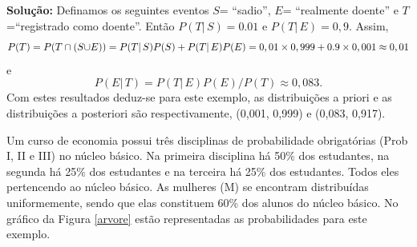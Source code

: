 \begin{frame}

{\bf Solução:} Definamos os seguintes eventos $S$= ``sadio'', $E$= ``realmente doente'' e $T$=``registrado como doente''.  Então $P(T|\,S)=0.01$ e $P(T|\,E)=0,9$. Assim,  $$P(T)=P(T\cap (S{\huge \cup} E))=P(T|\,S)P(S)+P(T|\,E)P(E)=0,01\times 0,999+0.9\times 0,001\approx 0,01$$ e $$P(E|\,T)=P(T|\,E)P(E)/P(T)\approx 0,083.$$ Com estes resultados deduz-se  para este exemplo,  as distribuições a priori  e as distribuições a posteriori são respectivamente, (0,001, 0,999) e  (0,083, 0,917). 

\begin{exem}
	Um curso de economia possui três disciplinas de probabilidade obrigatórias (Prob I, II e III) no núcleo básico. Na primeira disciplina há 50\% dos estudantes, na segunda há 25\% dos estudantes e na terceira há 25\% dos estudantes. Todos eles pertencendo ao núcleo básico. As mulheres (M) se encontram distribuídas uniformemente, sendo que elas constituem  60\% dos alunos do núcleo básico. No gráfico da Figura \ref{arvore} estão representadas as probabilidades para este exemplo.
\end{exem}


\end{frame}

